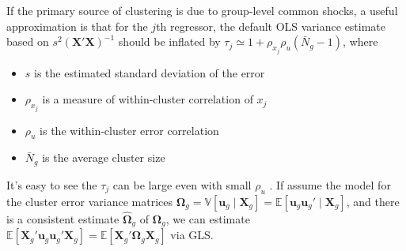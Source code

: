 \documentclass[twoside]{article}
\begin{document}
If the primary source of clustering is due to group-level common shocks, a useful approximation is that for the $j$th regressor, the default OLS variance estimate based on $s^2 \left(\mathbf{X'X}\right)^{-1}$ should be inflated by $\tau_j \simeq 1+\rho_{x_j}\rho_u\left(\bar{N}_g -1\right)$, where 
\begin{itemize}
    \item $s$ is the estimated standard deviation of the error
    \item $\rho_{x_j}$ is a measure of within-cluster correlation of $x_j$
    \item $\rho_u$ is the within-cluster error correlation 
    \item $\bar{N}_g$ is the average cluster size
\end{itemize}
It's easy to see the $\tau_j$ can be large even with small $\rho_u$ \citep{kloek1981ols,scott1982effect,moulton1990illustration}. If assume the model for the cluster error variance matrices $\boldsymbol{\Omega}_g = \mathbb{V}\left[\mathbf{u}_g \mid \mathbf{X}_g\right] = \mathbb{E}\left[\mathbf{u}_g\mathbf{u}_g'\mid \mathbf{X}_g\right]$, 
and there is a consistent estimate $\hat{\boldsymbol{\Omega}}_g$ of $\boldsymbol{\Omega}_g$, we can estimate $\mathbb{E}\left[\mathbf{X}_g'\mathbf{u}_g\mathbf{u}_g'\mathbf{X}_g\right] = \mathbb{E}\left[\mathbf{X}_g'\boldsymbol{\Omega}_g \mathbf{X}_g\right]$ via GLS.
\end{document}
